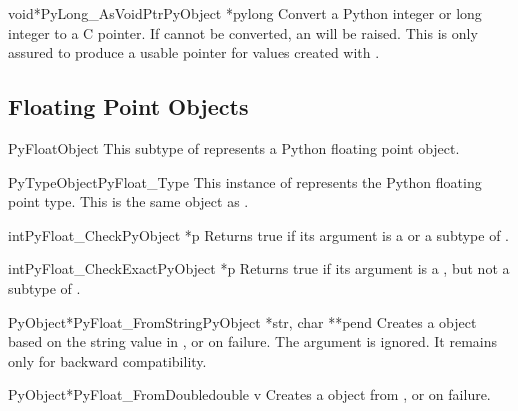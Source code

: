 \begin{cfuncdesc}{void*}{PyLong_AsVoidPtr}{PyObject *pylong}
  Convert a Python integer or long integer  to a C
   pointer.  If  cannot be converted, an
   will be raised.  This is only assured to
  produce a usable  pointer for values created with
  .
\end{cfuncdesc}


\subsection{Floating Point Objects \label{floatObjects}}

\begin{ctypedesc}{PyFloatObject}
  This subtype of  represents a Python floating point
  object.
\end{ctypedesc}

\begin{cvardesc}{PyTypeObject}{PyFloat_Type}
  This instance of  represents the Python floating
  point type.  This is the same object as .
\end{cvardesc}

\begin{cfuncdesc}{int}{PyFloat_Check}{PyObject *p}
  Returns true if its argument is a  or a subtype
  of .
\end{cfuncdesc}

\begin{cfuncdesc}{int}{PyFloat_CheckExact}{PyObject *p}
  Returns true if its argument is a , but not a
  subtype of .
\end{cfuncdesc}

\begin{cfuncdesc}{PyObject*}{PyFloat_FromString}{PyObject *str, char **pend}
  Creates a  object based on the string value in
  , or \NULL{} on failure.  The  argument is ignored.  It
  remains only for backward compatibility.
\end{cfuncdesc}

\begin{cfuncdesc}{PyObject*}{PyFloat_FromDouble}{double v}
  Creates a  object from , or \NULL{} on
  failure.
\end{cfuncdesc}

